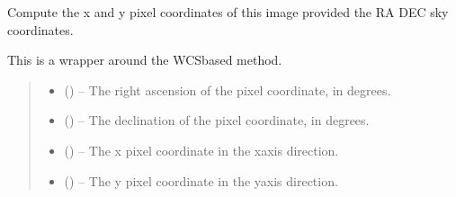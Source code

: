 \documentclass[letterpaper,11pt,english]{sphinxmanual}
\begin{document}
\begin{savenotes}
\begin{fulllineitems}
\begin{savenotes}\begin{fulllineitems}
\label{\detokenize{code/opihiexarata.astrometry.solution:opihiexarata.astrometry.solution.AstrometricSolution.sky_to_pixel_coordinates}}
\pysigstartsignatures
{}
\pysigstopsignatures
\sphinxAtStartPar
Compute the x and y pixel coordinates of this image provided
the RA DEC sky coordinates.

\sphinxAtStartPar
This is a wrapper around the WCS\sphinxhyphen{}based method.
\begin{quote}\begin{description}
\begin{itemize}
\item {} 
\sphinxAtStartPar
{} () – The right ascension of the pixel coordinate, in degrees.

\item {} 
\sphinxAtStartPar
{} () – The declination of the pixel coordinate, in degrees.

\end{itemize}

\sphinxAtStartPar
\begin{itemize}
\item {} 
\sphinxAtStartPar
{} () – The x pixel coordinate in the x\sphinxhyphen{}axis direction.

\item {} 
\sphinxAtStartPar
{} () – The y pixel coordinate in the y\sphinxhyphen{}axis direction.

\end{itemize}


\end{description}\end{quote}

\end{fulllineitems}\end{savenotes}


\end{fulllineitems}\end{savenotes}
\end{document}
